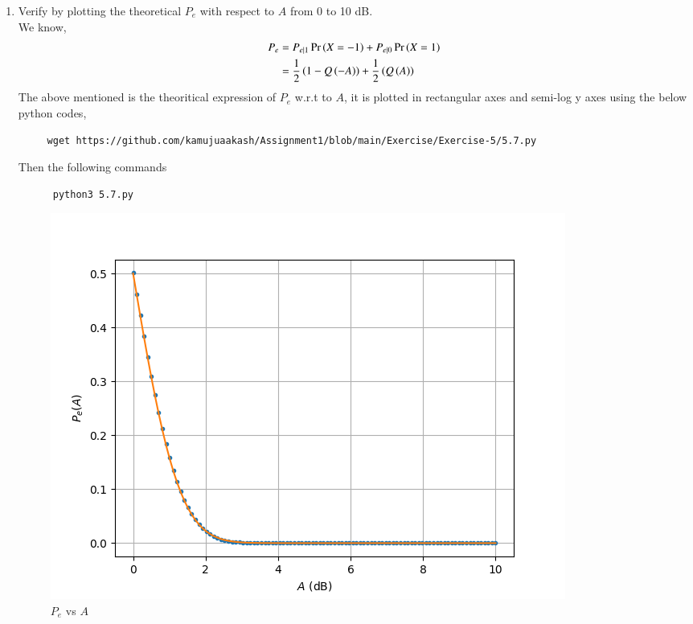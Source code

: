 \documentclass[journal,12pt,twocolumn]{IEEEtran}
\renewcommand\thesection{\arabic{section}}
\begin{document}
\begin{enumerate}[label=\thesection.\arabic*
,ref=\thesection.\theenumi]
\begin{enumerate}[label=\thesection.\arabic*
,ref=\thesection.\theenumi]
   \begin{align}
	   P_{e} &= \pr{e|1}\pr{X = -1} + \pr{e|0}\pr{X=1}\\
		       &= \frac{1}{2}\brak{\pr{e|1} + \pr{e|0}}
   \end{align}
From $\eqref{eq:5-5-1}$,$\eqref{eq:5-5-2}$
   \begin{align}
	   \pr{e} &= 2.866515719013649e-07 
   \end{align}
\item
Verify by plotting  the theoretical $P_e$ with respect to $A$ from 0 to 10 dB.\\
 \solution
   We know,
     \begin{align}
	     P_e  &= P_{e|1}\Pr\left(X = -1\right) + P_{e|0}\Pr\left(X=1\right) \\
		  &= \frac{1}{2}\left( 1 - Q\left(-A\right)\right) + \frac{1}{2}\left(Q\left(A\right)\right)
     \end{align}
    The above mentioned is the theoritical expression of $P_e$ w.r.t to $A$, it is plotted in rectangular axes and semi-log y axes using the below python codes,
    \begin{lstlisting}
     wget https://github.com/kamujuaakash/Assignment1/blob/main/Exercise/Exercise-5/5.7.py
    \end{lstlisting}
Then the following commands
    \begin{lstlisting}
      python3 5.7.py
    \end{lstlisting}
\begin{figure}
  \centering
  \includegraphics[width=\columnwidth]{5.7.png}
  \caption{$P_e$ vs $A$}
  \label{fig:P_e_A}
 \end{figure}

\end{enumerate}
\end{enumerate}
\end{document}
